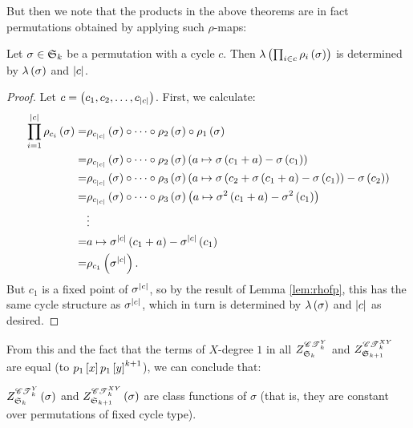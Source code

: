 \documentclass[distribution,draft]{brandiss} %
\numberwithin{section}{chapter}
\numberwithin{figure}{chapter}
\begin{document}
But then we note that the products in the above theorems are in fact permutations obtained by applying such $\rho$-maps:
\begin{lemma}
  \label{lem:rhoprod}
  Let $\sigma \in \symgp{k}$ be a permutation with a cycle $c$.
  Then $\lambda \pbrac{\prod_{i \in c} \rho_{i} \pbrac{\sigma}}$ is determined by $\lambda \pbrac{\sigma}$ and $\abs{c}$.
\end{lemma}
\begin{proof}
  Let $c = \pbrac{c_{1}, c_{2}, \dots, c_{\abs{c}}}$.
  First, we calculate:
  \begin{align*}
    \prod_{i = 1}^{\abs{c}} \rho_{c_{i}} \pbrac{\sigma} =& \rho_{c_{\abs{c}}} \pbrac{\sigma} \circ \dots \circ \rho_{2} \pbrac{\sigma} \circ \rho_{1} \pbrac{\sigma} \\
  =& \rho_{c_{\abs{c}}} \pbrac{\sigma} \circ \dots \circ \rho_{2} \pbrac{\sigma} \pbrac{a \mapsto \sigma \pbrac{c_{1} + a} - \sigma \pbrac{c_{1}}} \\
  =& \rho_{c_{\abs{c}}} \pbrac{\sigma} \circ \dots \circ \rho_{3} \pbrac{\sigma} \pbrac{a \mapsto \sigma \pbrac{c_{2} + \sigma \pbrac{c_{1} + a} - \sigma \pbrac{c_{1}}} - \sigma \pbrac{c_{2}}} \\
  =& \rho_{c_{\abs{c}}} \pbrac{\sigma} \circ \dots \circ \rho_{3} \pbrac{\sigma} \pbrac{a \mapsto \sigma^{2} \pbrac{c_{1} + a} - \sigma^{2} \pbrac{c_{1}}} \\
  &\vdots \\
  =& a \mapsto \sigma^{\abs{c}} \pbrac{c_{1} + a} - \sigma^{\abs{c}} \pbrac{c_{1}} \\
  =& \rho_{c_{1}} \pbrac{\sigma^{\abs{c}}}.
  \end{align*}
  But $c_{1}$ is a fixed point of $\sigma^{\abs{c}}$, so by the result of Lemma \ref{lem:rhofp}, this has the same cycle structure as $\sigma^{\abs{c}}$, which in turn is determined by $\lambda \pbrac{\sigma}$ and $\abs{c}$ as desired.
\end{proof}

From this and the fact that the terms of $X$-degree $1$ in all $\gci{\cty{k}}{\symgp{k}}$ and $\gci{\ctxy{k}}{\symgp{k+1}}$ are equal (to $p_{1} \sbrac{x} p_{1} \sbrac{y}^{k+1}$), we can conclude that:
\begin{theorem}
  \label{thm:ctciclassfunc}
  $\gcielt{\cty{k}}{\symgp{k}}{\sigma}$ and $\gcielt{\ctxy{k}}{\symgp{k+1}}{\sigma}$ are class functions of $\sigma$ (that is, they are constant over permutations of fixed cycle type).
\end{theorem}
\end{document}

